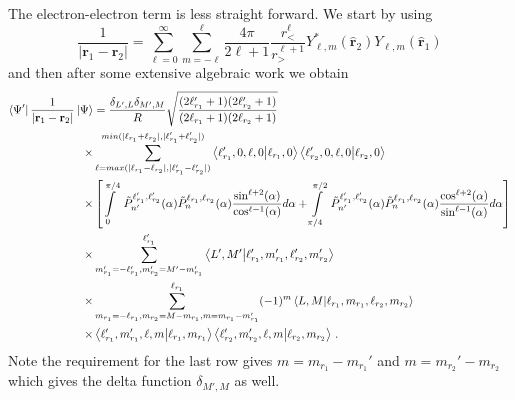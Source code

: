 The electron-electron term is less straight forward. We start by using 
\begin{equation}
  \frac{1}{|\mathbf{r}_1-\mathbf{r}_2|} = \sum_{\ell=0}^\infty \sum_{m=-\ell}^\ell \frac{4\pi}{2\ell+1} \frac{r_<^\ell}{r_>^{\ell+1}} Y^*_{\ell,m}(\hat{\mathbf{r}}_2)Y_{\ell,m}(\hat{\mathbf{r}}_1)
\end{equation}
and then after some extensive algebraic work we obtain 
\begin{align}
  \bra{\Psi'}\frac{1}{|\mathbf{r}_1-\mathbf{r}_2|}\ket{\Psi} &= \frac{\delta_{L',L}\delta_{M',M}}{R} \sqrt{\frac{(2\ell_{r_1}'+1)(2\ell_{r_2}'+1)}{(2\ell_{r_1}+1)(2\ell_{r_2}+1)}}\\
  \times& \sum_{\ell=max(|\ell_{r_1}-\ell_{r_2}|,|\ell_{r_1}'-\ell_{r_2}'|)}^{min(|\ell_{r_1}+\ell_{r_2}|,|\ell_{r_1}'+\ell_{r_2}'|)} \bra{\ell_{r_1}',0,\ell,0}\ket{\ell_{r_1},0} \bra{\ell_{r_2}',0,\ell,0}\ket{\ell_{r_2},0} \\
  \times& \left[\int\limits_0^{\pi/4}\ \tilde{P}^{\ell_{r_1}',\ell_{r_2}'}_{n'}(\alpha) \tilde{P}^{\ell_{r_1},\ell_{r_2}}_{n}(\alpha) \frac{\sin^{\ell+2}(\alpha)}{\cos^{\ell-1}(\alpha)}d\alpha + \int\limits_{\pi/4}^{\pi/2}\ \tilde{P}^{\ell_{r_1}',\ell_{r_2}'}_{n'}(\alpha) \tilde{P}^{\ell_{r_1},\ell_{r_2}}_{n}(\alpha) \frac{\cos^{\ell+2}(\alpha)}{\sin^{\ell-1}(\alpha)}d\alpha\right]\\
  \times& \sum_{m_{r_1}'=-\ell_{r_1}', m_{r_2}' = M'-m_{r_1}'}^{\ell_{r_1}'} \bra{L',M'}\ket{\ell_{r_1}',m_{r_1}',\ell_{r_2}',m_{r_2}'}\\
  \times& \sum_{m_{r_1}=-\ell_{r_1}, m_{r_2} = M-m_{r_1}, m = m_{r_1}-m_{r_1}'}^{\ell_{r_1}} (-1)^m \bra{L,M}\ket{\ell_{r_1},m_{r_1},\ell_{r_2},m_{r_2}}\\
  \times& \bra{\ell_{r_1}',m_{r_1}',\ell,m}\ket{\ell_{r_1},m_{r_1}} \bra{\ell_{r_2}',m_{r_2}',\ell,m}\ket{\ell_{r_2},m_{r_2}}\, .
\end{align}
Note the requirement for the last row gives $m=m_{r_1}-m_{r_1}'$ and $m=m_{r_2}'-m_{r_2}$ which gives the delta function $\delta_{M',M}$ as well.

